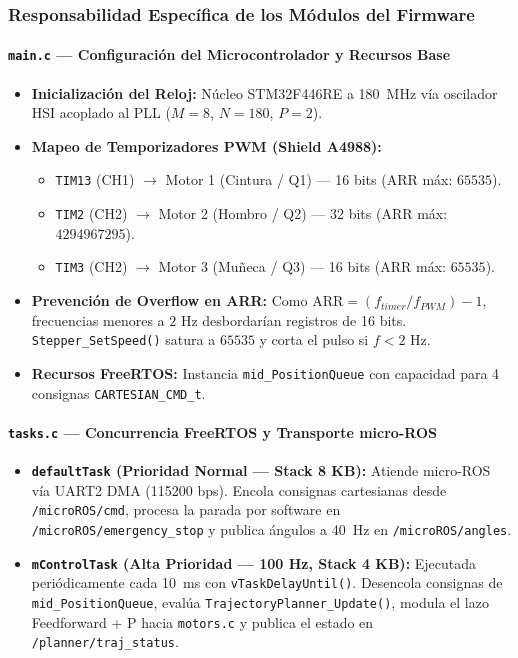 \documentclass[12pt, a4paper]{report}
\begin{document}
\subsubsection{Responsabilidad Específica de los Módulos del Firmware}

\paragraph{\texttt{main.c} --- Configuración del Microcontrolador y Recursos Base}
\begin{itemize}
    \item \textbf{Inicialización del Reloj:} Núcleo STM32F446RE a 180~MHz vía oscilador HSI acoplado al PLL ($M=8$, $N=180$, $P=2$).
    \item \textbf{Mapeo de Temporizadores PWM (Shield A4988):}
    \begin{itemize}
        \item \texttt{TIM13} (CH1) $\rightarrow$ Motor 1 (Cintura / Q1) --- 16 bits (ARR máx: $65535$).
        \item \texttt{TIM2} (CH2) $\rightarrow$ Motor 2 (Hombro / Q2) --- 32 bits (ARR máx: $4294967295$).
        \item \texttt{TIM3} (CH2) $\rightarrow$ Motor 3 (Muñeca / Q3) --- 16 bits (ARR máx: $65535$).
    \end{itemize}
    \item \textbf{Prevención de Overflow en ARR:} Como $\text{ARR} = (f_{timer}/f_{PWM}) - 1$, frecuencias menores a $2\text{ Hz}$ desbordarían registros de 16 bits. \texttt{Stepper\_SetSpeed()} satura a $65535$ y corta el pulso si $f < 2\text{ Hz}$.
    \item \textbf{Recursos FreeRTOS:} Instancia \texttt{mid\_PositionQueue} con capacidad para 4 consignas \texttt{CARTESIAN\_CMD\_t}.
\end{itemize}

\paragraph{\texttt{tasks.c} --- Concurrencia FreeRTOS y Transporte micro-ROS}
\begin{itemize}
    \item \textbf{\texttt{defaultTask} (Prioridad Normal --- Stack 8 KB):}
    Atiende micro-ROS vía UART2 DMA (115200 bps). Encola consignas cartesianas desde \texttt{/microROS/cmd}, procesa la parada por software en \texttt{/microROS/emergency\_stop} y publica ángulos a 40~Hz en \texttt{/microROS/angles}.
    \item \textbf{\texttt{mControlTask} (Alta Prioridad --- 100 Hz, Stack 4 KB):}
    Ejecutada periódicamente cada 10~ms con \texttt{vTaskDelayUntil()}. Desencola consignas de \texttt{mid\_PositionQueue}, evalúa \texttt{TrajectoryPlanner\_Update()}, modula el lazo Feedforward + P hacia \texttt{motors.c} y publica el estado en \texttt{/planner/traj\_status}.
\end{itemize}
\end{document}
